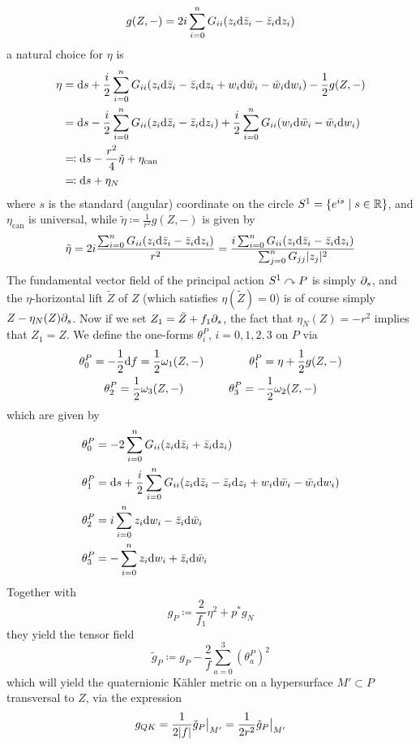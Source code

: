 \documentclass[parskip=half]{scrartcl}
\begin{document}
\begin{equation*}
	g(Z,-)= 2i\sum_{i=0}^n G_{ii} (z_i\mathrm{d} \bar z_i-\bar z_i \mathrm{d} z_i)
\end{equation*}
a natural choice for $\eta$ is
\begin{align*}
	\eta&=\mathrm{d} s+\frac{i}{2}\sum_{i=0}^nG_{ii}(z_i\mathrm{d} \bar z_i - \bar z_i \mathrm{d} z_i+w_i\mathrm{d} \bar w_i - \bar w_i \mathrm{d} w_i)-\frac{1}{2}g(Z,-)\\
	&=\mathrm{d} s -\frac{i}{2}\sum_{i=0}^n G_{ii} (z_i \mathrm{d} \bar z_i - \bar z_i \mathrm{d} z_i)
	+\frac{i}{2}\sum_{i=0}^n G_{ii} (w_i \mathrm{d} \bar w_i-\bar w_i \mathrm{d} w_i)\\
	& \eqqcolon \mathrm{d} s -\frac{r^2}{4}\tilde\eta+\eta_\text{can}\\
	&\eqqcolon \mathrm{d} s + \eta_N
\end{align*}
where $s$ is the standard (angular) coordinate on the circle $S^1=\{e^{is}\mid s\in \mathbb{R}\}$, and $\eta_\text{can}$ is universal, while $\tilde\eta\coloneqq\frac{1}{r^2}g(Z,-)$ is given by
\begin{equation*}
	\tilde\eta=2i\frac{\sum_{i=0}^n G_{ii} (z_i \mathrm{d} \bar z_i - \bar z_i \mathrm{d} z_i)}{r^2}
	=\frac{i\sum_{i=0}^n G_{ii} (z_i \mathrm{d} \bar z_i - \bar z_i \mathrm{d} z_i)}{\sum_{j=0}^n G_{jj} \lvert z_j \rvert^2}
\end{equation*}
The fundamental vector field of the principal action $S^1\curvearrowright P$ is simply $\partial_s$, and the $\eta$-horizontal lift $\tilde Z$ of $Z$ (which satisfies $\eta(\tilde Z)=0$) is of course simply $Z-\eta_N(Z)\partial_s$. Now if we set $Z_1=\tilde Z+f_1 \partial_s$, the fact that $\eta_N(Z)=-r^2$ implies that $Z_1=Z$. We define the one-forms $\theta^P_i$, $i=0,1,2,3$ on $P$ via
\begin{gather*}
	\theta^P_0=-\frac{1}{2}\mathrm{d} f=\frac{1}{2}\omega_1(Z,-)\qquad \qquad 
	\theta^P_1=\eta+\frac{1}{2}g(Z,-)\\
	\theta^P_2=\frac{1}{2}\omega_3(Z,-)\qquad \qquad 
	\theta^P_3=-\frac{1}{2}\omega_2(Z,-)
\end{gather*}
which are given by
\begin{align*}
	\theta^P_0&=-2\sum_{i=0}^n G_{ii}(z_i \mathrm{d} \bar z_i+\bar z_i \mathrm{d} z_i)\\
	\theta^P_1&=\mathrm{d} s +\frac{i}{2}\sum_{i=0}^n G_{ii}
	(z_i \mathrm{d} \bar z_i - \bar z_i \mathrm{d} z_i + w_i \mathrm{d} \bar w_i - \bar w_i \mathrm{d} w_i)\\
	\theta^P_2&=i\sum_{i=0}^n z_i \mathrm{d} w_i - \bar z_i \mathrm{d} \bar w_i\\
	\theta^P_3&=-\sum_{i=0}^n z_i \mathrm{d} w_i + \bar z_i \mathrm{d} \bar w_i
\end{align*}
Together with 
\begin{equation*}
	g_P\coloneqq\frac{2}{f_1}\eta^2+p^*g_N
\end{equation*}
they yield the tensor field 
\begin{equation*}
	\tilde g_P\coloneqq g_P-\frac{2}{f}\sum_{a=0}^3 (\theta^P_a)^2
\end{equation*}
which will yield the quaternionic K\"ahler metric on a hypersurface $M'\subset P$ transversal to $Z$, via the expression
\begin{equation*}
	g_{QK}=\frac{1}{2\lvert f \rvert}\tilde g_P\big|_{M'}=\frac{1}{2r^2}\tilde g_P\big|_{M'}
\end{equation*}
\end{document}
